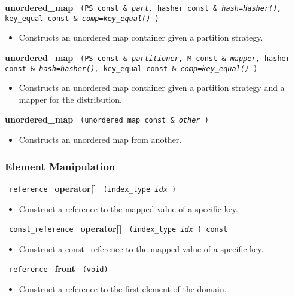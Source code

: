 \noindent
\textbf{unordered\_map}%
\texttt{%
(PS const \&
\textit{part,}%
hasher const \&
\textit{hash=hasher(),}%
key\_equal const \&
\textit{comp=key\_equal()}%
)
}

\begin{itemize}
\item
Constructs an unordered map container given a partition strategy. 
\end{itemize}
 
\noindent
\textbf{unordered\_map}%
\texttt{%
(PS const \&
\textit{partitioner,}%
M const \&
\textit{mapper,}%
hasher const \&
\textit{hash=hasher(),}%
key\_equal const \&
\textit{comp=key\_equal()}%
)
}

\begin{itemize}
\item
Constructs an unordered map container given a partition strategy and a mapper for the distribution. 
\end{itemize}
 
\noindent
\textbf{unordered\_map}%
\texttt{%
(unordered\_map const \&
\textit{other}%
)
}

\begin{itemize}
\item
Constructs an unordered map from another.
\end{itemize}

\subsubsection{Element Manipulation}

\noindent
\texttt{%
reference
}
\textbf{operator[]}%
\texttt{%
(index\_type 
\textit{idx}%
)
}

\begin{itemize}
\item
Construct a reference to the mapped value of a specific key.
\end{itemize}
 
\noindent%
\texttt{%
const\_reference
}
\textbf{operator[]}%
\texttt{%
(index\_type 
\textit{idx}%
) const
}

\begin{itemize}
\item
Construct a const\_reference to the mapped value of a specific key.
\end{itemize}
 
\noindent
\texttt{%
reference
}
\textbf{front}%
\texttt{%
(void)
}

\begin{itemize}
\item
Construct a reference to the first element of the domain.
\end{itemize}
 
